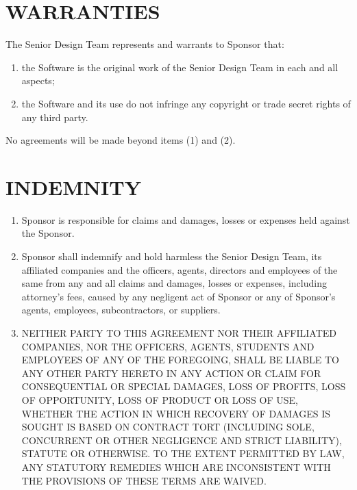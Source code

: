 \section{WARRANTIES }  

The Senior Design Team represents and warrants to Sponsor that:         
\begin{enumerate}  \itemsep4pt \parskip0pt 
\item  the Software is the original work of the Senior Design Team in each and all aspects;        

\item the Software and its use do not infringe any copyright or   trade secret rights of any third party.  
\end{enumerate}
No agreements will be made beyond items (1) and (2).

\section{INDEMNITY}   
\begin{enumerate}  \itemsep4pt \parskip0pt 
\item Sponsor is responsible for claims and damages, losses or expenses held against the Sponsor.

\item  Sponsor shall       indemnify and hold harmless the Senior Design Team, its affiliated companies       and the officers, agents, directors and employees of the same from       any and all claims and damages, losses or expenses, including       attorney's fees, caused by any negligent act of Sponsor or any of       Sponsor's agents, employees, subcontractors, or suppliers.    

\item  NEITHER PARTY TO THIS AGREEMENT NOR THEIR AFFILIATED COMPANIES,       NOR THE OFFICERS, AGENTS, STUDENTS AND EMPLOYEES OF ANY OF THE       FOREGOING, SHALL BE LIABLE TO ANY OTHER PARTY HERETO IN ANY ACTION       OR CLAIM FOR CONSEQUENTIAL OR SPECIAL DAMAGES, LOSS OF PROFITS,       LOSS OF OPPORTUNITY, LOSS OF PRODUCT OR LOSS OF USE, WHETHER THE       ACTION IN WHICH RECOVERY OF DAMAGES IS SOUGHT IS BASED ON CONTRACT       TORT (INCLUDING SOLE, CONCURRENT OR OTHER NEGLIGENCE AND STRICT       LIABILITY), STATUTE OR OTHERWISE. TO THE EXTENT PERMITTED BY LAW,       ANY STATUTORY REMEDIES WHICH ARE INCONSISTENT WITH THE PROVISIONS       OF THESE TERMS ARE WAIVED.  
\end{enumerate}

